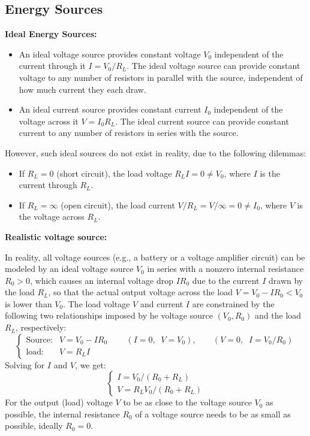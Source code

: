 \begin{itemize}
\begin{itemize}
\end{itemize}



\subsection*{Energy Sources}

{\bf Ideal Energy Sources:}
\begin{itemize}
\item An ideal voltage source provides constant voltage $V_0$ independent 
  of the current through it $I=V_0/R_L$. The ideal voltage source can
  provide constant voltage to any number of resistors in parallel with 
  the source, independent of how much current they each draw.
\item An ideal current source provides constant current $I_0$ independent 
  of the voltage across it $V=I_0 R_L$. The ideal current source can 
  provide constant current to any number of resistors in series with 
  the source.
\end{itemize}

However, such ideal sources do not exist in reality, due to the following
dilemmas:
\begin{itemize}
\item If $R_L=0$ (short circuit), the load voltage $R_L I=0\ne V_0$,
  where $I$ is the current through $R_L$.
\item If $R_L=\infty$ (open circuit), the load current $V/R_L=V/\infty=0\ne I_0$,
  where $V$ is the voltage across $R_L$.
\end{itemize}

{\bf Realistic voltage source:} 

In reality, all voltage sources (e.g., a battery or a voltage amplifier 
circuit) can be modeled by an ideal voltage source $V_0$ in series with a 
nonzero internal resistance $R_0>0$, which causes an internal voltage drop 
$IR_0$ due to the current $I$ drawn by the load $R_L$, so that the actual 
output voltage across the load $V=V_0-IR_0< V_0$ is lower than $V_0$. The
load voltage $V$ and current $I$ are constrained by the following two 
relationships imposed by he voltage source $(V_0, R_0)$ and the load $R_L$, 
respectively:
\[ 
\left\{ \begin{array}{lll}
  \mbox{Source:} &  V=V_0-IR_0\;\;\;\;\;\;\;\;
  (I=0,\;\;V=V_0),\;\;\;\;\;\;\;(V=0,\;\;I=V_0/R_0)\\ 
  \mbox{load:} & V=R_LI \end{array} \right.
\]
Solving for $I$ and $V$, we get:
\[ 
\left\{ \begin{array}{l}
  I=V_0/(R_0+R_L) \\ V= R_L V_0/(R_0+R_L) \end{array} \right. 
\]
For the output (load) voltage $V$ to be as close to the voltage source $V_0$
as possible, the internal resistance $R_0$ of a voltage source needs to be as 
small as possible, ideally $R_0=0$.


\end{itemize}
